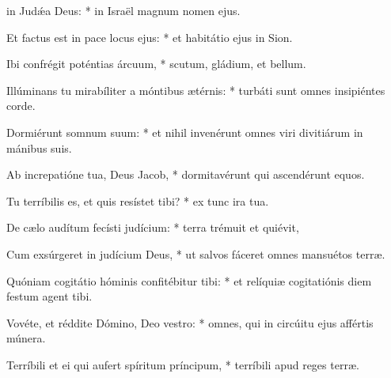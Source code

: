 \begin{psalmus}
   
		  in Judǽa Deus: * in Israël magnum nomen ejus.

		 Et factus est in pace locus ejus: * et habitátio ejus in Sion.

		 Ibi confrégit poténtias árcuum, * scutum, gládium, et bellum.

		 Illúminans tu mirabíliter a móntibus ætérnis: * turbáti sunt omnes insipiéntes corde.

		 Dormiérunt somnum suum: * et nihil invenérunt omnes viri divitiárum in mánibus suis.

		 Ab increpatióne tua, Deus Jacob, * dormitavérunt qui ascendérunt equos.

		 Tu terríbilis es, et quis resístet tibi? * ex tunc ira tua.

		 De cælo audítum fecísti judícium: * terra trémuit et quiévit,

		 Cum exsúrgeret in judícium Deus, * ut salvos fáceret omnes mansuétos terræ.

		 Quóniam cogitátio hóminis confitébitur tibi: * et relíquiæ cogitatiónis diem festum agent tibi.

		 Vovéte, et réddite Dómino, Deo vestro: * omnes, qui in circúitu ejus affértis múnera.

		 Terríbili et ei qui aufert spíritum príncipum, * terríbili apud reges terræ.
    
    \end{psalmus}
